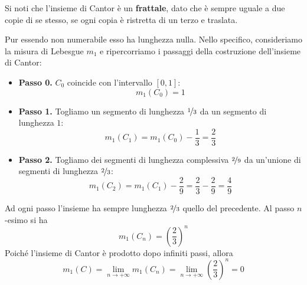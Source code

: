 \begin{digression}
	Si noti che l'insieme di Cantor è un \textbf{frattale}, dato che è sempre uguale a due copie di se stesso, se ogni copia è ristretta di un terzo e traslata.
\end{digression}
Pur essendo non numerabile esso ha lunghezza nulla. Nello specifico, consideriamo la misura di Lebesgue $m_1$ e ripercorriamo i passaggi della costruzione dell'insieme di Cantor:
\begin{itemize}
	\item \textbf{Passo 0.} $C_0$ coincide con l'intervallo $\left[0,1\right]$:
	\begin{equation*}
		m_1\left(C_0\right)=1
	\end{equation*}
	\item \textbf{Passo 1.} Togliamo un segmento di lunghezza $\nicefrac{1}{3}$ da un segmento di lunghezza $1$:
	\begin{equation*}
		m_1\left(C_1\right)=m_1\left(C_0\right)-\frac{1}{3}=\frac{2}{3}
	\end{equation*}
	\item \textbf{Passo 2.} Togliamo dei segmenti di lunghezza complessiva $\nicefrac{2}{9}$ da un'unione di segmenti di lunghezza $\nicefrac{2}{3}$:
	\begin{equation*}
		m_1\left(C_2\right)=m_1\left(C_1\right)-\frac{2}{9}=\frac{2}{3}-\frac{2}{9}=\frac{4}{9}
	\end{equation*}
\end{itemize}
Ad ogni passo l'insieme ha sempre lunghezza $\nicefrac{2}{3}$ quello del precedente. Al passo $n$-esimo si ha
\begin{equation*}
	m_1\left(C_n\right)=\left(\frac{2}{3}\right)^n
\end{equation*}
Poiché l'insieme di Cantor è prodotto dopo infiniti passi, allora
\begin{equation*}
	m_1\left(C\right)=\lim_{n\to+\infty}m_1\left(C_n\right)=\lim_{n\to+\infty}\left(\frac{2}{3}\right)^n=0
\end{equation*}
